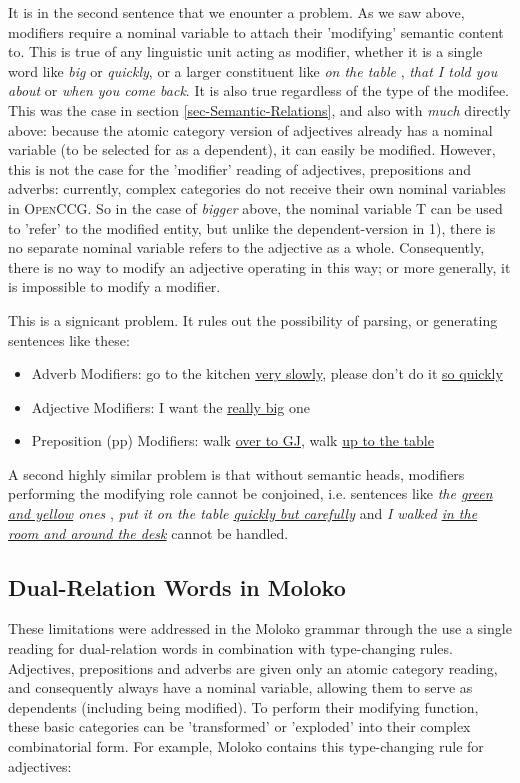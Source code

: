 It is in the second sentence that we enounter a problem. As we saw above, modifiers require a nominal variable to attach their 'modifying' semantic content to. This is true of any linguistic unit acting as modifier, whether it is a single word like \emph{big} or \emph{quickly}, or a larger constituent like \emph{on the table} , \emph{that I told you about} or \emph{when you come back}. It is also true regardless of the type of the modifee. This was the case in section \ref{sec-Semantic-Relations}, and also with \emph{much} directly above: because the atomic category version of adjectives already has a nominal variable (to be selected for as a dependent), it can easily be modified. However, this is not the case for the 'modifier' reading of adjectives, prepositions and adverbs: currently, complex categories do not receive their own nominal variables in \textsc{OpenCCG}. So in the case of \emph{bigger} above, the nominal variable T can be used to 'refer' to the modified entity, but unlike the dependent-version in 1), there is no separate nominal variable refers to the adjective as a whole. Consequently, there is no way to modify an adjective operating in this way; or more generally, it is impossible to modify a modifier.

This is a signicant problem. It rules out the possibility of parsing, or generating sentences like these:
\begin{itemize}
\item	Adverb Modifiers: go to the kitchen \underline{very slowly}, please don't do it \underline{so quickly}
\item	Adjective Modifiers:	I want the \underline{really big} one
\item Preposition (pp) Modifiers: walk \underline{over to GJ}, walk \underline{up to the table} 
\end{itemize}									 
A second highly similar problem is that without semantic heads, modifiers performing the modifying role cannot be conjoined, i.e. sentences like \emph{the \underline{green and yellow} ones  }, \emph{put it on the table \underline{quickly but carefully}  } and \emph{I walked \underline{in the room and around the desk}} cannot be handled. 
	
\subsection{Dual-Relation Words in Moloko} \label{sec-Dual-Relation-in-Moloko}

These limitations were addressed in the Moloko grammar through the use a single reading for dual-relation words in combination with type-changing rules. Adjectives, prepositions and adverbs are given only an atomic category reading, and consequently always have a nominal variable, allowing them to serve as dependents (including being modified). To perform their modifying function, these basic categories can be 'transformed' or 'exploded' into their complex combinatorial form. For example, Moloko contains this type-changing rule for adjectives: \\

